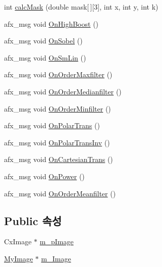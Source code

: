 \begin{DoxyCompactItemize}
\item 
int \hyperlink{class_c_my_image_processing_doc_a541cb66c2473454a49be669acaa0db67}{calc\-Mask} (double mask\mbox{[}$\,$\mbox{]}\mbox{[}3\mbox{]}, int x, int y, int k)
\item 
afx\-\_\-msg void \hyperlink{class_c_my_image_processing_doc_a02adaf0fa2601aa7257403f3add15d45}{On\-High\-Boost} ()
\item 
afx\-\_\-msg void \hyperlink{class_c_my_image_processing_doc_ae1eb87303d441fee44eee9cc0713f35e}{On\-Sobel} ()
\item 
afx\-\_\-msg void \hyperlink{class_c_my_image_processing_doc_a81bf8bfe13998034c311facb4480b72a}{On\-Sm\-Lin} ()
\item 
afx\-\_\-msg void \hyperlink{class_c_my_image_processing_doc_ae19b8ec98c48bb0092cd6d49a4365870}{On\-Order\-Maxfilter} ()
\item 
afx\-\_\-msg void \hyperlink{class_c_my_image_processing_doc_a179bd964abd852b3276b536e6d1cbfaa}{On\-Order\-Medianfilter} ()
\item 
afx\-\_\-msg void \hyperlink{class_c_my_image_processing_doc_a086368f43f1bdca128134b4397942516}{On\-Order\-Minfilter} ()
\item 
afx\-\_\-msg void \hyperlink{class_c_my_image_processing_doc_afdc7a9e36d9ec2d9f600737ed67a31d7}{On\-Polar\-Trans} ()
\item 
afx\-\_\-msg void \hyperlink{class_c_my_image_processing_doc_a2ce4f7dce9e33b9bb7baf5cfc908b516}{On\-Polar\-Trans\-Inv} ()
\item 
afx\-\_\-msg void \hyperlink{class_c_my_image_processing_doc_a7798d32dd4e007b2f92a4cfd17863660}{On\-Cartesian\-Trans} ()
\item 
afx\-\_\-msg void \hyperlink{class_c_my_image_processing_doc_a59e47774204f909d57cbb86b12a2d0ab}{On\-Power} ()
\item 
afx\-\_\-msg void \hyperlink{class_c_my_image_processing_doc_acc6818171d5d567884143cdd10a5cb25}{On\-Order\-Meanfilter} ()
\end{DoxyCompactItemize}
\subsection*{Public 속성}
\begin{DoxyCompactItemize}
\item 
Cx\-Image $\ast$ \hyperlink{class_c_my_image_processing_doc_ad5fdd82c16f80240fb27e6f3a04a333b}{m\-\_\-p\-Image}
\item 
\hyperlink{class_my_image}{My\-Image} $\ast$ \hyperlink{class_c_my_image_processing_doc_a4f70944ed5cc5c772165aec9a9e88c69}{m\-\_\-\-Image}
\end{DoxyCompactItemize}

